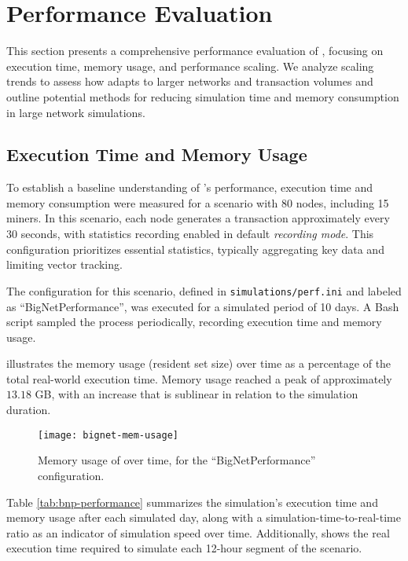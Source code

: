 \section{Performance Evaluation}\label{sec:evaluation}

This section presents a comprehensive performance evaluation of \iblock{},
focusing on execution time, memory usage, and performance scaling. We analyze
scaling trends to assess how \iblock{} adapts to larger networks and
transaction volumes and outline potential methods for reducing simulation
time and memory consumption in large network simulations.

\subsection{Execution Time and Memory
Usage}\label{subsec:execution-time-memory-usage}

To establish a baseline understanding of \iblock{}'s performance, execution
time and memory consumption were measured for a scenario with 80 nodes,
including 15 miners. In this scenario, each node generates a transaction
approximately every 30 seconds, with statistics recording enabled in default
\textit{recording mode}. This configuration prioritizes essential statistics,
typically aggregating key data and limiting vector tracking.

The configuration for this scenario, defined in \texttt{simulations/perf.ini}
and labeled as ``BigNetPerformance'', was executed for a simulated period of 10
days. A Bash script sampled the process periodically, recording execution time
and memory usage.

 illustrates the memory usage (resident set size)
over time as a percentage of the total real-world execution time. Memory usage
reached a peak of approximately \(13.18\) GB, with an increase that is
sublinear in relation to the simulation duration.

\begin{figure}[tbhp]
	\centering
	\texttt{[image: bignet-mem-usage]}
	\caption{Memory usage of \iblock{} over time, for the
	``BigNetPerformance'' configuration.}\label{fig:bnp-memory-usage}
\end{figure}

Table \ref{tab:bnp-performance} summarizes the simulation's execution time and
memory usage after each simulated day, along with a
simulation-time-to-real-time ratio as an indicator of simulation speed over
time. Additionally,  shows the real execution
time required to simulate each 12-hour segment of the scenario.

